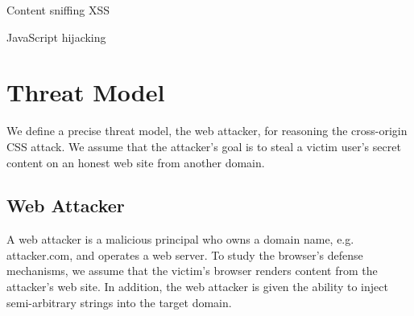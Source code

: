 \documentclass{acm_proc_article-sp}
\begin{document}
Content sniffing XSS\cite{securecontentsniffing}

JavaScript hijacking\cite{jshijacking}

\section{Threat Model}
We define a precise threat model, the web attacker, for reasoning the cross-origin CSS attack. We assume that the attacker's goal is to steal a victim user's secret content on an honest web site from another domain.

\subsection{Web Attacker}
A web attacker is a malicious principal who owns a domain name, e.g. attacker.com, and operates a web server. To study the browser's defense mechanisms, we assume that the victim's browser renders content from the attacker's web site. In addition, the web attacker is given the ability to inject semi-arbitrary strings into the target domain.
\end{document}
